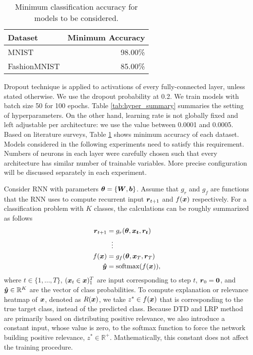 \begin{table}[h]
\centering
\begin{tabular}{ll}
\multicolumn{1}{l|}{\textbf{Dataset}} & \textbf{Minimum Accuracy} \\ \hline
\multicolumn{1}{l|}{MNIST}            & \multicolumn{1}{r}{98.00\%}  \\
\multicolumn{1}{l|}{FashionMNIST}    & \multicolumn{1}{r}{85.00\%}  \\
\end{tabular}
\caption{Minimum classification accuracy for models to be considered.}
\label{tab:min_acc}
\end{table}



Dropout technique \cite{SrivastavaDropoutSimpleWay2014} is applied to activations of every fully-connected layer, unless stated otherwise. We use the dropout probability at 0.2. We train models with batch size 50 for 100 epochs. Table \ref{tab:hyper_summary} summaries the setting of hyperparameters. On the other hand, learning rate is not globally fixed and left adjustable per architecture: we use the value between 0.0001 and 0.0005. Based on literature surveys, Table \ref{tab:min_acc} shows minimum accuracy of each dataset. Models considered in the following experiments need to satisfy this requirement.  Numbers of neurons in each layer were carefully chosen such that every architecture has similar number of trainable variables. More precise configuration will be discussed separately in each experiment. 

Consider RNN with parameters $\boldsymbol{\theta} = \{ \patmatrix{W}, \boldsymbol{b} \}$. Assume that $g_r$ and $g_{f}$ are functions that the RNN uses to compute recurrent input $\patvector{r}_{t+1}$ and $f(\boldsymbol{x})$ respectively. For a classification problem with $K$ classes, the calculations can be  roughly summarized as follows
 \begin{align}
 	\patvector{r}_{t+1} &= g_r(\patvector{\theta}, \patvector{x_t}, \patvector{r_t}) \\
 	 &\ \ \vdots\\
f(\x) &= g_{f}(\patvector{\theta}, \patvector{x}_{T},  \patvector{r}_{T}) \\
 	\patvector{\hat{y}} &= \text{softmax}(f(\x)),
 \end{align}
 where $t \in \{1, \dots, T\}$, $(\boldsymbol{x}_t \in \boldsymbol{x})_1^{T}$ are input corresponding to  step $t$, $\patvector{r}_0 = \patvector{0}$, and $\patvector{\hat{y}} \in \mathbb{R}^K$ are the vector of class probabilities. To compute explanation or relevance heatmap of $\boldsymbol{x}$, denoted as $R(\boldsymbol{x})$, we take $z^* \in f(\boldsymbol{x})$ that is corresponding to the true target class, instead of the predicted class.  Because DTD and LRP method are primarily  based on distributing positive relevance, we also introduce a constant input, whose value is zero, to the softmax function to force the network building positive relevance, $z^* \in \mathbb{R}^+$. Mathematically, this constant does not affect the training procedure.

